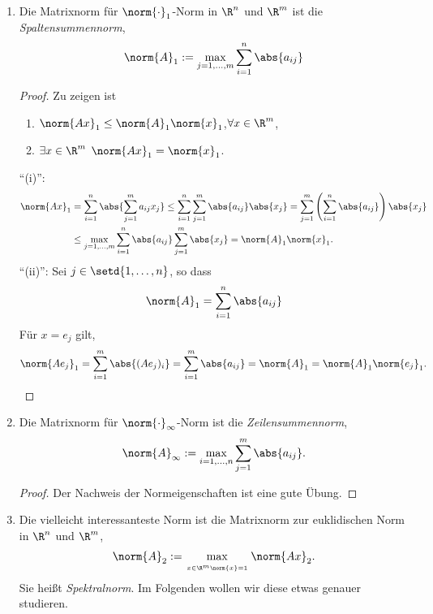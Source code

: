 \begin{bspn}
\begin{enumerate}[label=\arabic{*}.)]
  \item 
Die Matrixnorm für $\norm{\cdot}_1$-Norm in $\R^n$ und $\R^m$ ist die
\emph{Spaltensummennorm},
\begin{align*}
\norm{A}_1 := \max\limits_{j=1,\ldots,m}\sum\limits_{i=1}^n\abs{a_{ij}}
\end{align*}
\begin{proof}
Zu zeigen ist
\begin{enumerate}[label=(\roman{*})]
  \item $\norm{Ax}_1 \le \norm{A}_1\norm{x}_1$,\qquad $\forall x\in\R^m$,
  \item $\exists x\in\R^m$ $\norm{Ax}_1=\norm{x}_1$.
\end{enumerate}
``(i)'':
\begin{align*}
\norm{Ax}_1 &= \sum\limits_{i=1}^n \abs{\sum\limits_{j=1}^m a_{ij} x_j}
\le \sum\limits_{i=1}^n\sum\limits_{j=1}^m \abs{a_{ij}}\abs{x_j}
= \sum\limits_{j=1}^m\left(\sum\limits_{i=1}^n \abs{a_{ij}}\right)\abs{x_j}\\ 
& \le \max\limits_{j=1,\ldots,m} \sum\limits_{i=1}^n \abs{a_{ij}}
\sum\limits_{j=1}^m \abs{x_j} = \norm{A}_1 \norm{x}_1.
\end{align*}
``(ii)'': Sei $j\in\setd{1,\ldots,n}$, so dass
\begin{align*}
\norm{A}_1 =\sum\limits_{i=1}^n\abs{a_{ij}}
\end{align*}
Für $x=e_j$ gilt,
\begin{align*}
\norm{Ae_j}_1 = \sum\limits_{i=1}^m \abs{(Ae_j)_i} = \sum\limits_{i=1}^m
\abs{a_{ij}} = \norm{A}_1 = \norm{A}_1\norm{e_j}_1.\qedhere
\end{align*}
\end{proof}
\item Die Matrixnorm für $\norm{\cdot}_\infty$-Norm ist die
\emph{Zeilensummennorm},
\begin{align*}
\norm{A}_\infty := \max\limits_{i=1,\ldots,n} \sum\limits_{j=1}^m \abs{a_{ij}}.
\end{align*}
\begin{proof}
Der Nachweis der Normeigenschaften ist eine gute Übung.\qedhere
\end{proof}
\item
Die vielleicht interessanteste Norm ist die Matrixnorm zur euklidischen Norm in
$\R^n$ und $\R^m$,
\begin{align*}
\norm{A}_2 := \max\limits_{\atop{x\in\R^m}{\norm{x}=1}} \norm{Ax}_2.
\end{align*}
Sie heißt \emph{Spektralnorm}. Im Folgenden wollen wir diese etwas genauer
studieren.\bsphere
\end{enumerate}
\end{bspn}


